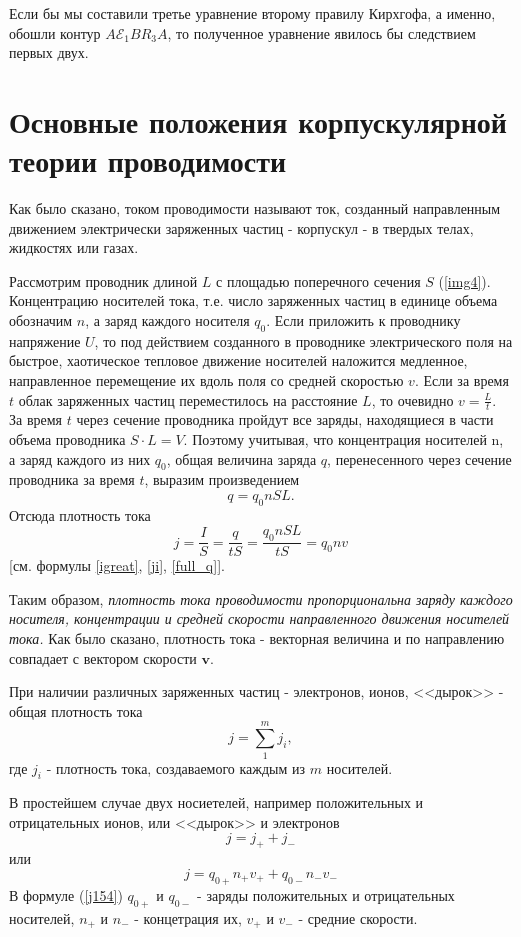 \documentclass[a4paper,10pt]{book}
\begin{document}
Если бы мы составили третье уравнение  второму правилу Кирхгофа, а именно, обошли контур $A\mathcal{E}_1BR_3A$, то полученное уравнение явилось бы следствием первых двух.
\chapter{Основные положения корпускулярной теории проводимости}
Как было сказано, током проводимости называют ток, созданный направленным движением электрически заряженных частиц - корпускул - в твердых телах, жидкостях или газах.
 
Рассмотрим проводник длиной $L$ с площадью поперечного сечения $S$ (\ref{img4}). Концентрацию носителей тока, т.е. число заряженных частиц в единице объема обозначим $n$, а заряд каждого носителя $q_0$. Если приложить к проводнику напряжение $U$, то под действием созданного в проводнике электрического поля на быстрое, хаотическое тепловое движение носителей наложится медленное, направленное перемещение их вдоль поля со средней скоростью $v$. Если за время $t$ облак заряженных частиц переместилось на расстояние $L$, то очевидно $v = \frac{L}{t}$. За время $t$ через сечение проводника пройдут все заряды, находящиеся в части объема проводника $S\cdot L = V$. Поэтому учитывая, что концентрация
носителей n, а заряд каждого из них $q_0$, общая величина заряда $q$, перенесенного через сечение проводника за время $t$, выразим произведением
\begin{equation}\label{full_q}
 q = q_0nSL.
\end{equation}
Отсюда плотность тока
\begin{equation}\label{density}
 j = \frac{I}{S} = \frac{q}{tS} = \frac{q_0nSL}{tS} = q_0nv
\end{equation}
[см. формулы \ref{igreat}, \ref{ji}, \ref{full_q}].

Таким образом, \emph{плотность тока проводимости пропорциональна заряду каждого носителя, концентрации и средней скорости направленного движения носителей тока.} Как было сказано, плотность тока - векторная величина и по направлению совпадает с вектором скорости $\mathbf{v}$.

При наличии различных заряженных частиц - электронов, ионов, <<дырок>> - общая плотность тока
\begin{equation}\label{job}
 j = \sum_1^mj_i,
\end{equation}
где $j_i$ - плотность тока, создаваемого каждым из $m$ носителей.

В простейшем случае двух носиетелей, например положительных и отрицательных ионов, или <<дырок>> и электронов
\begin{equation*}
 j = j_+ + j_-
\end{equation*}
или
\begin{equation}\label{j154}
  j = q_{0+}n_+v_+ + q_{0-}n_-v_-
\end{equation}
В формуле (\ref{j154}) $q_{0+}$ и $q_{0-}$ - заряды положительных и отрицательных носителей, $n_+$ и $n_-$ - концетрация их, $v_+$ и $v_-$ 
- средние скорости.
\end{document}

